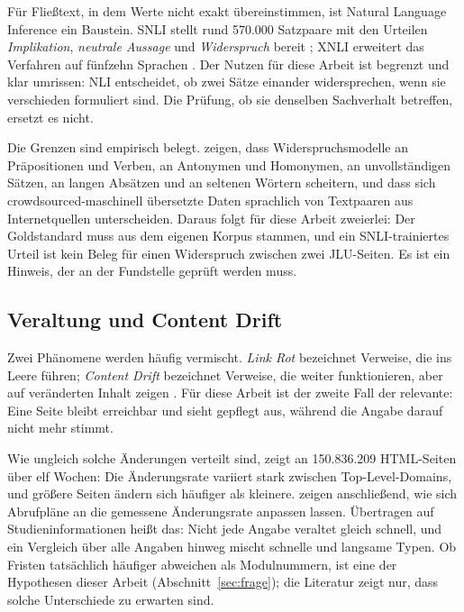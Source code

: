 Für Fließtext, in dem Werte nicht exakt übereinstimmen, ist Natural Language Inference ein
Baustein. SNLI stellt rund 570.000 Satzpaare mit den Urteilen \emph{Implikation}, \emph{neutrale
Aussage} und \emph{Widerspruch} bereit \parencite{bowman2015snli}; XNLI erweitert das
Verfahren auf fünfzehn Sprachen \parencite{conneau2018xnli}. Der Nutzen für diese Arbeit ist
begrenzt und klar umrissen: NLI entscheidet, ob zwei Sätze einander widersprechen, wenn sie
verschieden formuliert sind. Die Prüfung, ob sie denselben Sachverhalt betreffen, ersetzt es
nicht.

Die Grenzen sind empirisch belegt. \textcite{pielka2022} zeigen, dass Widerspruchsmodelle an
Präpositionen und Verben, an Antonymen und Homonymen, an unvollständigen Sätzen, an langen
Absätzen und an seltenen Wörtern scheitern, und dass sich crowdsourced-maschinell übersetzte
Daten sprachlich von Textpaaren aus Internetquellen unterscheiden. Daraus folgt für diese
Arbeit zweierlei: Der Goldstandard muss aus dem eigenen Korpus stammen, und ein
SNLI-trainiertes Urteil ist kein Beleg für einen Widerspruch zwischen zwei JLU-Seiten. Es ist
ein Hinweis, der an der Fundstelle geprüft werden muss.

\subsection{Veraltung und Content Drift}

Zwei Phänomene werden häufig vermischt. \emph{Link Rot} bezeichnet Verweise, die ins Leere
führen; \emph{Content Drift} bezeichnet Verweise, die weiter funktionieren, aber auf
veränderten Inhalt zeigen \parencite{klein2014,jones2016}. Für diese Arbeit ist der zweite
Fall der relevante: Eine Seite bleibt erreichbar und sieht gepflegt aus, während die Angabe
darauf nicht mehr stimmt.

Wie ungleich solche Änderungen verteilt sind, zeigt \textcite{fetterly2003} an 150.836.209
HTML-Seiten über elf Wochen: Die Änderungsrate variiert stark zwischen Top-Level-Domains, und
größere Seiten ändern sich häufiger als kleinere. \textcite{cho2000freshness} zeigen
anschließend, wie sich Abrufpläne an die gemessene Änderungsrate anpassen lassen. Übertragen
auf Studieninformationen heißt das: Nicht jede Angabe veraltet gleich schnell, und ein
Vergleich über alle Angaben hinweg mischt schnelle und langsame Typen. Ob Fristen tatsächlich
häufiger abweichen als Modulnummern, ist eine der Hypothesen dieser Arbeit
(Abschnitt~\ref{sec:frage}); die Literatur zeigt nur, dass solche Unterschiede zu erwarten
sind.

